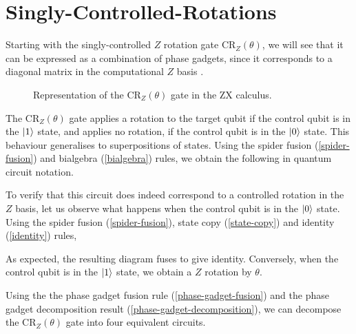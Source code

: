\section{Singly-Controlled-Rotations}%
\label{singly-controlled-rotations}

Starting with the singly-controlled $Z$ rotation gate CR$_Z(\theta)$, we will see that it can be expressed as a combination of phase gadgets, since it corresponds to a diagonal matrix in the computational $Z$ basis \cite{Yeung2020}.

\begin{figure}[H]
    \centering
    \caption{Representation of the CR$_Z(\theta)$ gate in the ZX calculus.}
    \label{crz}
\end{figure}

The CR$_Z(\theta)$ gate applies a rotation to the target qubit if the control qubit is in the $\ket 1$ state, and applies no rotation, if the control qubit is in the $\ket 0$ state. This behaviour generalises to superpositions of states. Using the spider fusion (\ref{spider-fusion}) and bialgebra (\ref{bialgebra}) rules, we obtain the following in quantum circuit notation.


To verify that this circuit does indeed correspond to a controlled rotation in the $Z$ basis, let us observe what happens when the control qubit is in the $\ket 0$ state. Using the spider fusion (\ref{spider-fusion}), state copy (\ref{state-copy}) and identity (\ref{identity}) rules,


As expected, the resulting diagram fuses to give identity. Conversely, when the control qubit is in the $\ket 1$ state, we obtain a $Z$ rotation by $\theta$.


Using the the phase gadget fusion rule (\ref{phase-gadget-fusion}) and the phase gadget decomposition result (\ref{phase-gadget-decomposition}), we can decompose the CR$_Z(\theta)$ gate into four equivalent circuits.

